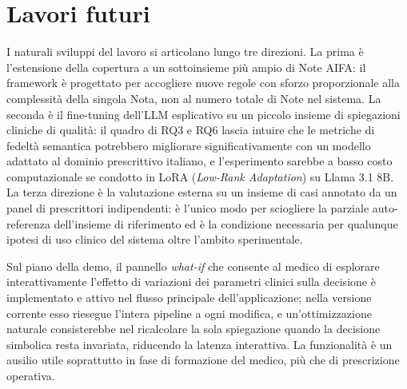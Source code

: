 \section{Lavori futuri}
\label{sec:concl-futuri}

I naturali sviluppi del lavoro si articolano lungo tre direzioni. La prima è l'estensione della copertura a un sottoinsieme più ampio di Note AIFA: il framework è progettato per accogliere nuove regole con sforzo proporzionale alla complessità della singola Nota, non al numero totale di Note nel sistema. La seconda è il fine-tuning dell'LLM esplicativo su un piccolo insieme di spiegazioni cliniche di qualità: il quadro di RQ3 e RQ6 lascia intuire che le metriche di fedeltà semantica potrebbero migliorare significativamente con un modello adattato al dominio prescrittivo italiano, e l'esperimento sarebbe a basso costo computazionale se condotto in LoRA (\emph{Low-Rank Adaptation}) su Llama 3.1 8B. La terza direzione è la valutazione esterna su un insieme di casi annotato da un panel di prescrittori indipendenti: è l'unico modo per sciogliere la parziale auto-referenza dell'insieme di riferimento ed è la condizione necessaria per qualunque ipotesi di uso clinico del sistema oltre l'ambito sperimentale.

Sul piano della demo, il pannello \emph{what-if} che consente al medico di esplorare interattivamente l'effetto di variazioni dei parametri clinici sulla decisione è implementato e attivo nel flusso principale dell'applicazione; nella versione corrente esso riesegue l'intera pipeline a ogni modifica, e un'ottimizzazione naturale consisterebbe nel ricalcolare la sola spiegazione quando la decisione simbolica resta invariata, riducendo la latenza interattiva. La funzionalità è un ausilio utile soprattutto in fase di formazione del medico, più che di prescrizione operativa.
